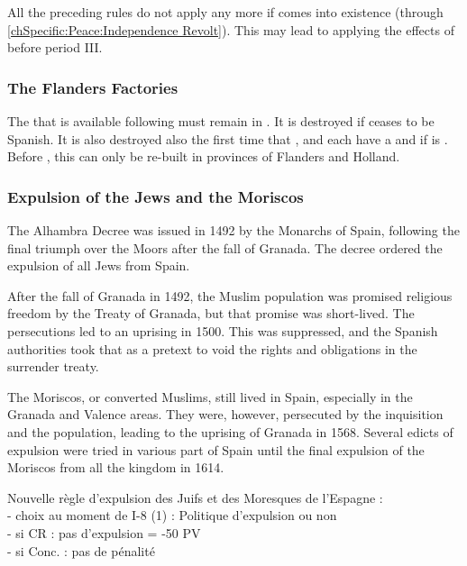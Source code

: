 \aparag All the preceding rules do not apply any more if
 comes into existence (through
\ref{chSpecific:Peace:Independence Revolt}). This may lead to applying
the effects of  before period III.


\subsubsection{The Flanders Factories}\label{chSpecific:Spain:Cloth}
\aparag The  \MNU that is available following
 must remain in
. It is destroyed if  ceases
to be Spanish.
\bparag It is also destroyed also the first time that \ENG, \HOL and
\FRA each have a  \MNU and if \SPA is
.
\bparag Before , this  \MNU can only
be re-built in provinces of Flanders and Holland.


\subsubsection{Expulsion of the Jews and the Moriscos}
\label{chSpecific:Spain:Expulsion}
\begin{histoire}
  The Alhambra Decree was issued in 1492 by the Monarchs of Spain,
  following the final triumph over the Moors after the fall of
  Granada. The decree ordered the expulsion of all Jews from Spain.

  After the fall of Granada in 1492, the Muslim population was promised
  religious freedom by the Treaty of Granada, but that promise was
  short-lived. The persecutions led to an uprising in 1500. This was
  suppressed, and the Spanish authorities took that as a pretext to void
  the rights and obligations in the surrender treaty.

  The Moriscos, or converted Muslims, still lived in Spain, especially
  in the Granada and Valence areas. They were, however, persecuted by
  the inquisition and the population, leading to the uprising of Granada
  in 1568. Several edicts of expulsion were tried in various part of
  Spain until the final expulsion of the Moriscos from all the kingdom
  in 1614.
\end{histoire}

\aparag  Nouvelle règle d'expulsion des Juifs et des Moresques de l'Espagne : \\
- choix au moment de I-8 (1) : Politique d'expulsion ou non \\
- si CR : pas d'expulsion = -50 PV \\
- si Conc. : pas de pénalité \\


